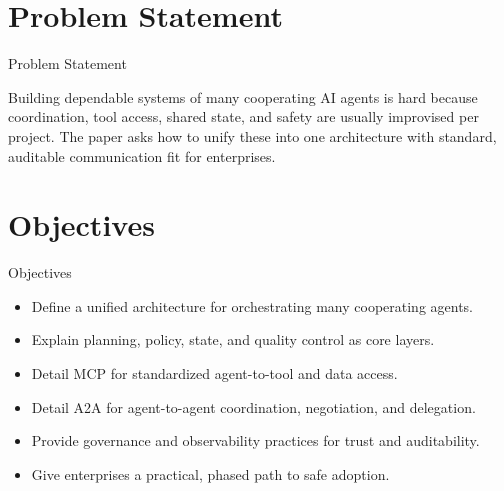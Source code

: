 \documentclass[10pt]{beamer}
\begin{document}
\section{Problem Statement}
\begin{frame}{Problem Statement}
  \begin{block}{}
  Building dependable systems of many cooperating AI agents is hard because coordination, tool access, shared state, and safety are usually improvised per project. The paper asks how to unify these into one architecture with standard, auditable communication fit for enterprises.
  \end{block}
\end{frame}
\section{Objectives}
\begin{frame}{Objectives}
\begin{itemize}
  \item Define a unified architecture for orchestrating many cooperating agents.
  \item Explain planning, policy, state, and quality control as core layers.
  \item Detail MCP for standardized agent-to-tool and data access.
  \item Detail A2A for agent-to-agent coordination, negotiation, and delegation.
  \item Provide governance and observability practices for trust and auditability.
  \item Give enterprises a practical, phased path to safe adoption.
\end{itemize}
\end{frame}
\end{document}
